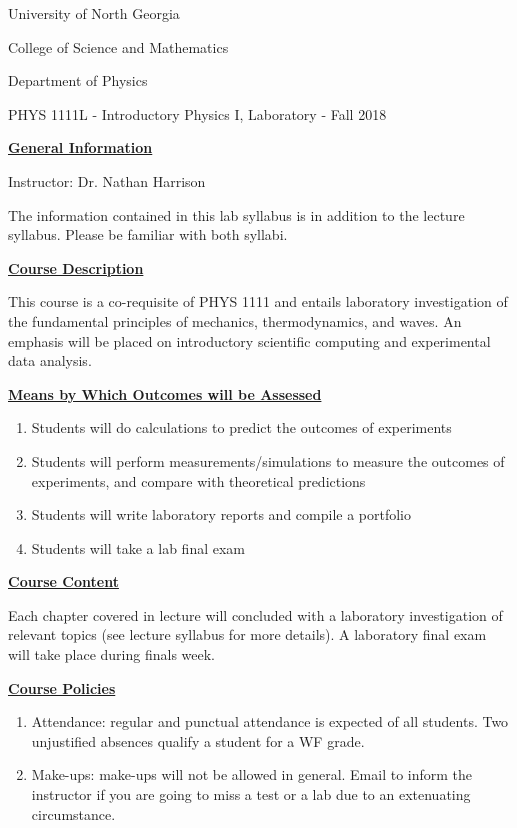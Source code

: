 \documentclass[12pt]{article}
\begin{document}
{\centering
\large University of North Georgia \par
\large College of Science and Mathematics \par
\large Department of Physics \par
\large PHYS 1111L - Introductory Physics I, Laboratory - Fall 2018 \par
}
\hfill \break \vspace{-4mm}

\underline{\textbf{General Information}} \par
Instructor: Dr. Nathan Harrison \par
The information contained in this lab syllabus is in addition to the lecture syllabus. Please be familiar with both syllabi.
\hfill \break

\underline{\textbf{Course Description}} \par
This course is a co-requisite of PHYS 1111 and entails laboratory investigation of the fundamental principles of mechanics, thermodynamics, and waves.
An emphasis will be placed on introductory scientific computing and experimental data analysis.
\hfill \break

\underline{\textbf{Means by Which Outcomes will be Assessed}} \par
\begin{enumerate}
\item Students will do calculations to predict the outcomes of experiments
\item Students will perform measurements/simulations to measure the outcomes of experiments, and compare with theoretical predictions
\item Students will write laboratory reports and compile a portfolio
\item Students will take a lab final exam
\end{enumerate}

\underline{\textbf{Course Content}} \par
Each chapter covered in lecture will concluded with a laboratory investigation of relevant topics (see lecture syllabus for more details).
A laboratory final exam will take place during finals week.
\hfill \break

\underline{\textbf{Course Policies}} \par
\begin{enumerate}
\item Attendance: regular and punctual attendance is expected of all students. Two unjustified absences qualify a student for a WF grade.
\item Make-ups: make-ups will not be allowed in general. Email to inform the instructor if you are going to miss a test or a lab due to an extenuating circumstance.
\end{enumerate}
\end{document}
